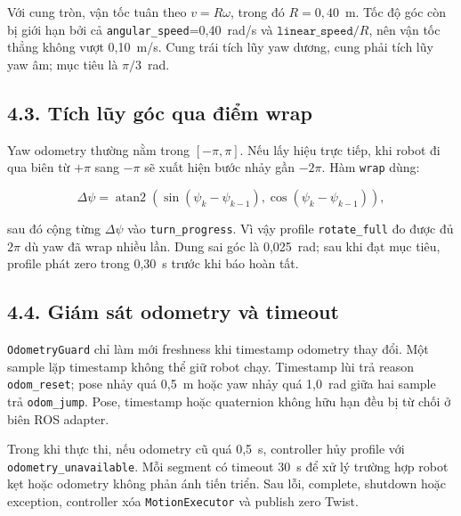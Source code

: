 Với cung tròn, vận tốc tuân theo $v=R\omega$, trong đó $R=0,40$~m. Tốc độ góc
còn bị giới hạn bởi cả \texttt{angular\_speed}=0,40~rad/s và
$\texttt{linear\_speed}/R$, nên vận tốc thẳng không vượt 0,10~m/s. Cung trái
tích lũy yaw dương, cung phải tích lũy yaw âm; mục tiêu là
$\pi/3$~rad.

\subsection*{4.3. Tích lũy góc qua điểm wrap}

Yaw odometry thường nằm trong $[-\pi,\pi]$. Nếu lấy hiệu trực tiếp, khi robot
đi qua biên từ $+\pi$ sang $-\pi$ sẽ xuất hiện bước nhảy gần $-2\pi$. Hàm
\texttt{wrap} dùng:

\begin{equation}
  \Delta\psi = \operatorname{atan2}
  \left(\sin(\psi_k-\psi_{k-1}),\cos(\psi_k-\psi_{k-1})\right),
\end{equation}

sau đó cộng từng $\Delta\psi$ vào \texttt{turn\_progress}. Vì vậy profile
\texttt{rotate\_full} đo được đủ $2\pi$ dù yaw đã wrap nhiều lần. Dung sai góc
là 0,025~rad; sau khi đạt mục tiêu, profile phát zero trong 0,30~s trước khi
báo hoàn tất.

\subsection*{4.4. Giám sát odometry và timeout}

\texttt{OdometryGuard} chỉ làm mới freshness khi timestamp odometry thay đổi.
Một sample lặp timestamp không thể giữ robot chạy. Timestamp lùi trả reason
\texttt{odom\_reset}; pose nhảy quá 0,5~m hoặc yaw nhảy quá 1,0~rad giữa hai
sample trả \texttt{odom\_jump}. Pose, timestamp hoặc quaternion không hữu hạn
đều bị từ chối ở biên ROS adapter.

Trong khi thực thi, nếu odometry cũ quá 0,5~s, controller hủy profile với
\texttt{odometry\_unavailable}. Mỗi segment có timeout 30~s để xử lý trường hợp
robot kẹt hoặc odometry không phản ánh tiến triển. Sau lỗi, complete, shutdown
hoặc exception, controller xóa \texttt{MotionExecutor} và publish zero Twist.

